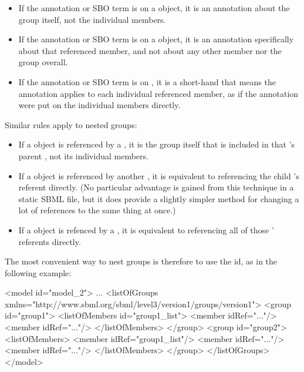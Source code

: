 \begin{itemize}

\item If the annotation or SBO term is on a \Group object, it is an annotation about the group itself, not the individual members.

\item If the annotation or SBO term is on a \Member object, it is an annotation specifically about that referenced member, and not about any other member nor the group overall.

\item If the annotation or SBO term is on \ListOfMembers, it is a short-hand that means the annotation applies to each individual referenced member, as if the annotation were put on the individual members directly.

\end{itemize}

\begin{blockChanged}
Similar rules apply to nested groups:

\begin{itemize}

\item If a \Group object is referenced by a \Member, it is the group itself that is included in that \Member's parent \Group, not its individual members.

\item If a \Member object is referenced by another \Member, it is equivalent to referencing the child \Member's referent directly.  (No particular advantage is gained from this technique in a static SBML file, but it does provide a slightly simpler method for changing a lot of references to the same thing at once.)

\item If a \ListOfMembers object is refenced by a \Member, it is equivalent to referencing all of those \ListOfMembers' referents directly.

\end{itemize}

The most convenient way to nest groups is therefore to use the \ListOfMembers id, as in the following example:

\end{blockChanged}


\begin{example}
<model id="model_2"> 
  ... 
  <listOfGroups xmlns="http://www.sbml.org/sbml/level3/version1/groups/version1"> 
    <group id="group1"> 
      <listOfMembers id="group1_list"> 
        <member idRef="..."/> 
        <member idRef="..."/> 
      </listOfMembers> 
    </group> 
    <group id="group2"> 
      <listOfMembers> 
        <member idRef="group1_list"/> 
        <member idRef="..."/> 
        <member idRef="..."/> 
      </listOfMembers> 
    </group> 
  </listOfGroups> 
</model> 
\end{example}

